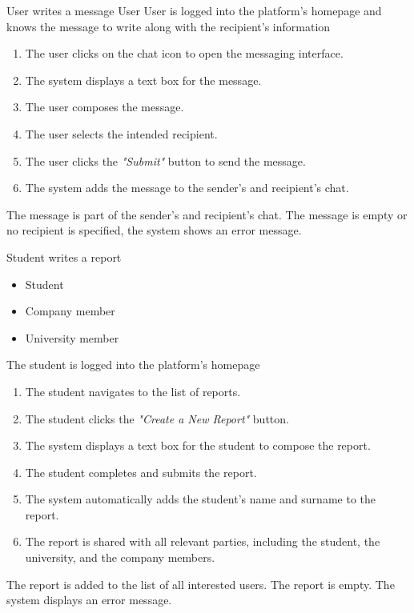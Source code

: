 \usecase
{User writes a message}
{User} %
{User is logged into the platform's homepage and knows the message to write along with the recipient's information}
{
    \begin{enumerate}
        \item The user clicks on the chat icon to open the messaging interface.
        \item The system displays a text box for the message.
        \item The user composes the message.
        \item The user selects the intended recipient.
        \item The user clicks the \textit{"Submit"} button to send the message.
        \item The system adds the message to the sender's and recipient's chat.
    \end{enumerate}
}
{The message is part of the sender's and recipient's chat.}
{The message is empty or no recipient is specified, the system shows an error message.}
{}

\usecase
{Student writes a report}
{\begin{itemize}
    \item Student
    \item Company member
    \item University member
\end{itemize}}
{The student is logged into the platform's homepage}
{
    \begin{enumerate}
        \item The student navigates to the list of reports.
        \item The student clicks the \textit{"Create a New Report"} button.
        \item The system displays a text box for the student to compose the report.
        \item The student completes and submits the report.
        \item The system automatically adds the student's name and surname to the report.
        \item The report is shared with all relevant parties, including the student, the university, and the company members.
    \end{enumerate}
}
{The report is added to the list of all interested users.}
{The report is empty. The system displays an error message. }
{}

